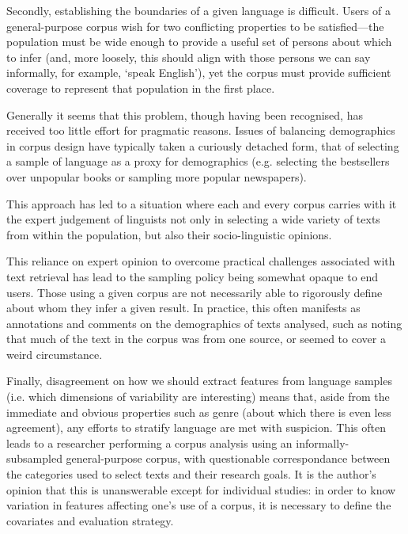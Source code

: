 

Secondly, establishing the boundaries of a given language is difficult.  Users of a general-purpose corpus wish for two conflicting properties to be satisfied---the population must be wide enough to provide a useful set of persons about which to infer (and, more loosely, this should align with those persons we can say informally, for example, `speak English'), yet the corpus must provide sufficient coverage to represent that population in the first place.

Generally it seems that this problem, though having been recognised, has received too little effort for pragmatic reasons.  Issues of balancing demographics in corpus design have typically taken a curiously detached form, that of selecting a sample of language as a proxy for demographics (e.g. selecting the bestsellers over unpopular books or sampling more popular newspapers).


This approach has led to a situation where each and every corpus carries with it the expert judgement of linguists not only in selecting a wide variety of texts from within the population, but also their socio-linguistic opinions.

This reliance on expert opinion to overcome practical challenges associated with text retrieval has lead to the sampling policy being somewhat opaque to end users.
Those using a given corpus are not necessarily able to rigorously define about whom they infer a given result.  In practice, this often manifests as annotations and comments on the demographics of texts analysed, such as noting that much of the text in the corpus was from one source, or seemed to cover a weird circumstance.



Finally, disagreement on how we should extract features from language samples (i.e. which dimensions of variability are interesting) means that, aside from the immediate and obvious properties such as genre (about which there is even less agreement), any efforts to stratify language are met with suspicion.  This often leads to a researcher performing a corpus analysis using an informally-subsampled general-purpose corpus, with questionable correspondance between the categories used to select texts and their research goals.
It is the author's opinion that this is unanswerable except for individual studies: in order to know variation in features affecting one's use of a corpus, it is necessary to define the covariates and evaluation strategy.

